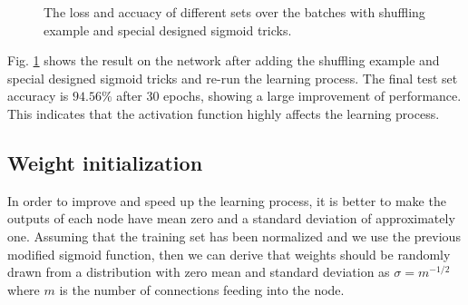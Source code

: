 \documentclass{article} %
\begin{document}
\begin{figure} [!htbp]
	
	\caption{The loss and accuacy of different sets over the batches with shuffling example and special designed sigmoid tricks. }  
	\label{fig:P3}
\end{figure}

Fig. \ref{fig:P3} shows the result on the network after adding the shuffling example and special designed sigmoid tricks and re-run the learning process. The final test set accuracy is $94.56\%$ after 30 epochs, showing a large improvement of performance. This indicates that the activation function highly affects the learning process.

\subsection{Weight initialization}
In order to improve and speed up the learning process, it is better to make the outputs of each node have mean zero and a standard deviation of approximately one. Assuming that the training set has been normalized and we use the previous modified sigmoid function, then we can derive that weights should be randomly drawn from a distribution with zero mean and standard deviation as $\sigma = m^{-1/2}$ where $m$ is the number of connections feeding into the node. 
\end{document}
